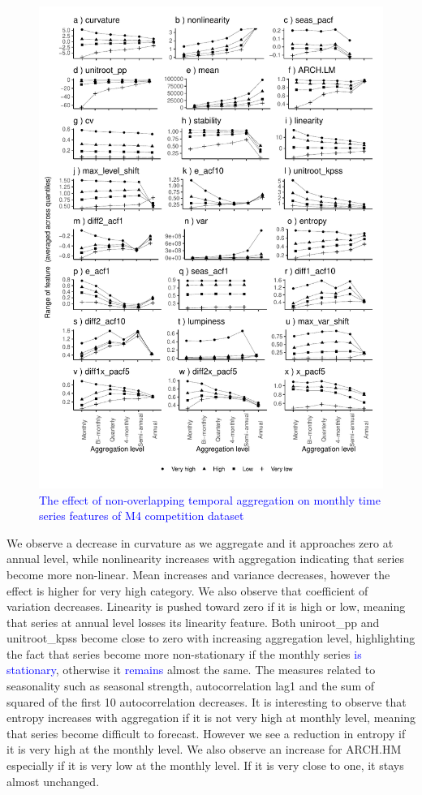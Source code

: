 \documentclass[preprint, 3p,
authoryear]{elsarticle} %
\begin{document}
\begin{figure}[H]

{\centering \includegraphics[width=0.7\linewidth]{img/300dpi/mp_category_all1} 

}

\caption{ \textcolor{blue}{The effect of non-overlapping temporal aggregation on monthly time series features of M4 competition dataset} }\label{fig:featureagg1}
\end{figure}

We observe a decrease in curvature as we aggregate and it approaches
zero at annual level, while nonlinearity increases with aggregation
indicating that series become more non-linear. Mean increases and
variance decreases, however the effect is higher for very high category.
We also observe that coefficient of variation decreases. Linearity is
pushed toward zero if it is high or low, meaning that series at annual
level losses its linearity feature. Both uniroot\_pp and unitroot\_kpss
become close to zero with increasing aggregation level, highlighting the
fact that series become more non-stationary if the monthly series
\textcolor{blue}{is stationary}, otherwise it \textcolor{blue}{remains}
almost the same. The measures related to seasonality such as seasonal
strength, autocorrelation lag1 and the sum of squared of the first 10
autocorrelation decreases. It is interesting to observe that entropy
increases with aggregation if it is not very high at monthly level,
meaning that series become difficult to forecast. However we see a
reduction in entropy if it is very high at the monthly level. We also
observe an increase for ARCH.HM especially if it is very low at the
monthly level. If it is very close to one, it stays almost unchanged.
\end{document}
